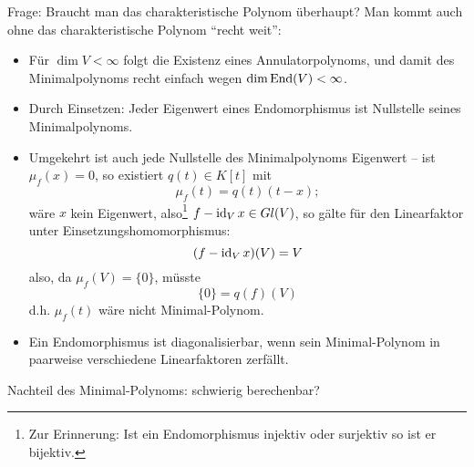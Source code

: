 	Frage: Braucht man das charakteristische Polynom überhaupt?
	Man kommt auch ohne das charakteristische Polynom "`recht weit"':
		\begin{itemize}
			\item Für $ \dim V <\infty $ folgt die Existenz eines Annulatorpolynoms, und damit des Minimalpolynoms recht einfach wegen $ \dim \operatorname{End}(V) <\infty $.
			\item Durch Einsetzen: Jeder Eigenwert eines Endomorphismus ist Nullstelle seines Minimalpolynoms.
			\item Umgekehrt ist auch jede Nullstelle des Minimalpolynoms Eigenwert -- ist $ \mu_f(x) = 0 $, so existiert $ q(t)\in K[t] $ mit
				\[ \mu_f(t) = q(t)(t-x); \]
			wäre $ x $ kein Eigenwert, also\footnote{Zur Erinnerung: Ist ein Endomorphismus injektiv oder surjektiv so ist er bijektiv.} $ f-\operatorname{id}_V x \in Gl(V) $, so gälte für den Linearfaktor unter Einsetzungshomomorphismus:
				\[ (f-\operatorname{id}_Vx)(V) = V \]
			also, da $\mu_f(V)=\{0\}$, müsste
				\[\{0\} = q(f)(V)\]
			d.h. $ \mu_f(t) $ wäre nicht Minimal-Polynom.
			\item Ein Endomorphismus ist diagonalisierbar, wenn sein Minimal-Polynom in paarweise verschiedene Linearfaktoren zerfällt.
		\end{itemize}
	
	Nachteil des Minimal-Polynoms: schwierig berechenbar?